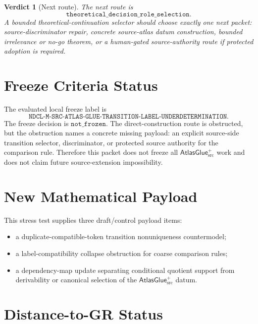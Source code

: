 \documentclass[11pt]{article}
\newcommand{\AtlasGlue}{\mathsf{AtlasGlue}_{\mathrm{src}}^{+}}
\newtheorem{verdict}{Verdict}
\begin{document}
\begin{verdict}[Next route]
The next route is
\[
  \texttt{theoretical\_decision\_role\_selection}.
\]
A bounded theoretical-continuation selector should choose exactly one next
packet: source-discriminator repair, concrete source-atlas datum construction,
bounded irrelevance or no-go theorem, or a human-gated source-authority route
if protected adoption is required.
\end{verdict}

\section{Freeze Criteria Status}

The evaluated local freeze label is
\[
\texttt{NDCL-M-SRC-ATLAS-GLUE-TRANSITION-LABEL-UNDERDETERMINATION}.
\]
The freeze decision is \(\texttt{not\_frozen}\). The direct-construction
route is obstructed, but the obstruction names a concrete missing payload: an
explicit source-side transition selector, discriminator, or protected source
authority for the comparison rule. Therefore this packet does not freeze all
\(\AtlasGlue\) work and does not claim future source-extension impossibility.

\section{New Mathematical Payload}

This stress test supplies three draft/control payload items:
\begin{itemize}
  \item a duplicate-compatible-token transition nonuniqueness countermodel;
  \item a label-compatibility collapse obstruction for coarse comparison
  rules;
  \item a dependency-map update separating conditional quotient support from
  derivability or canonical selection of the \(\AtlasGlue\) datum.
\end{itemize}

\section{Distance-to-GR Status}
\end{document}
